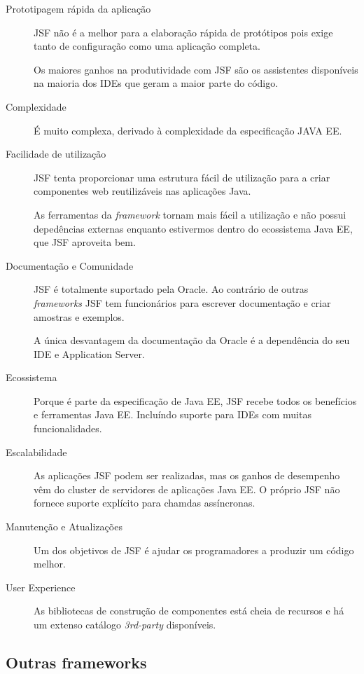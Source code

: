 \begin{description}
\item[Prototipagem rápida da aplicação] JSF não é a melhor para a elaboração rápida de protótipos pois exige tanto de configuração como uma aplicação completa.

Os maiores ganhos na produtividade com JSF são os assistentes disponíveis na maioria dos IDEs que geram a maior parte do código.

\item[Complexidade] É muito complexa, derivado à complexidade da especificação JAVA EE.

\item[Facilidade de utilização] JSF tenta proporcionar uma estrutura fácil de utilização para a criar componentes web reutilizáveis nas aplicações Java.

As ferramentas da \textit{framework} tornam mais fácil a utilização e não possui depedências externas enquanto estivermos dentro do ecossistema Java EE, que JSF aproveita bem.

\item[Documentação e Comunidade] JSF é totalmente suportado pela Oracle. Ao contrário de outras \textit{frameworks} JSF tem funcionários para escrever documentação e criar amostras e exemplos.

A única desvantagem da documentação da Oracle é a dependência do seu IDE e Application Server.

\item[Ecossistema] Porque é parte da especificação de Java EE, JSF recebe todos os benefícios e ferramentas Java EE. Incluíndo suporte para IDEs com muitas funcionalidades.

\item[Escalabilidade] As aplicações JSF podem ser realizadas, mas os ganhos de desempenho vêm do cluster de servidores de aplicações Java EE. O próprio JSF não fornece suporte explícito para chamdas assíncronas.

\item[Manutenção e Atualizações] Um dos objetivos de JSF é ajudar os programadores a produzir um código melhor.

\item[User Experience] As bibliotecas de construção de componentes está cheia de recursos e há um extenso catálogo \textit{3rd-party} disponíveis.
\end{description}

\subsection{Outras frameworks}

